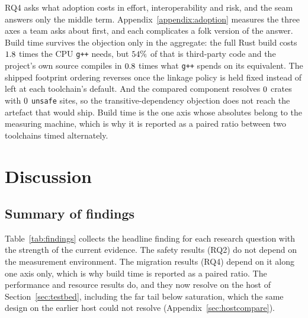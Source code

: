 \documentclass[english,oneside,a4paper,censored,csm,software-track-2020]{HYthesisML}
\begin{document}
RQ4 asks what adoption costs in effort, interoperability and risk, and the seam answers only the
middle term. Appendix~\ref{appendix:adoption} measures the three axes a team asks about first, and
each complicates a folk version of the answer. Build time survives the objection only in the
aggregate: the full Rust build costs $1.8$ times the CPU \texttt{g++} needs, but
$54\%$ of that is third-party code and the project's own source compiles in
$0.8$ times what \texttt{g++} spends on its equivalent. The shipped
footprint ordering reverses once the linkage policy is held fixed instead of left at each
toolchain's default. And the compared component resolves $0$ crates with $0$
\texttt{unsafe} sites, so the transitive-dependency objection does not reach the artefact that
would ship. Build time is the one axis whose absolutes belong to the measuring machine, which is
why it is reported as a paired ratio between two toolchains timed alternately.

\chapter{Discussion\label{chapter:discussion}}

\section{Summary of findings}
Table~\ref{tab:findings} collects the headline finding for each research question with the
strength of the current evidence. The safety results (RQ2) do not depend on the measurement
environment. The migration results (RQ4) depend on it along one axis only, which is why build
time is reported as a paired ratio. The performance and resource results do, and they now resolve
on the host of Section~\ref{sec:testbed}, including the far tail below saturation, which the same
design on the earlier host could not resolve (Appendix~\ref{sec:hostcompare}).
\end{document}
